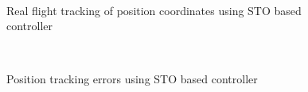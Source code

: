 \documentclass[letterpaper%
, twoside%
, 12pt%
,memoire%
, english%
,creativecommons,hyperref%
]{thETS}
\begin{document}
\begin{figure}[H]
	\centering
	 \\ \parbox{0.75\textwidth}{\caption{Real flight tracking of position coordinates using STO based controller\label{Fig:xyztracSTO}}}
\end{figure}

\begin{figure}[H]
	\centering
	 \\ \parbox{0.75\textwidth}{\caption{Position tracking errors using STO based controller\label{Fig:xyzerrSTO}}}
\end{figure}
\end{document}
